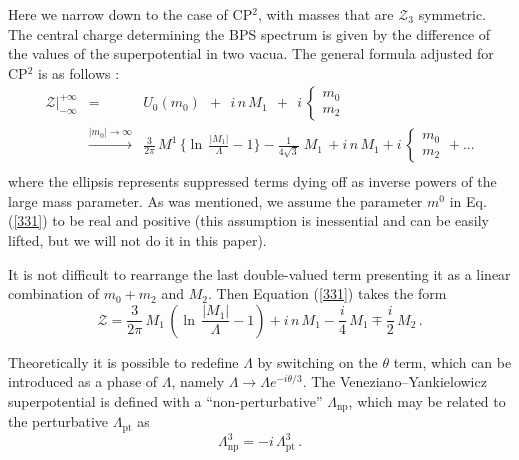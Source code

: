 \documentclass[epsfig,12pt]{article}
\def\beq{\begin{equation}}
\def\eeq{\end{equation}}
\def\beq{\begin{equation}}
\def\eeq{\end{equation}}
\newcommand{\mc}[1]{\mathcal{#1}}
\begin{document}
       Here we narrow down to the case of CP$^2$, with masses that are $ \mc{Z}_3 $ symmetric.
       The central charge determining the BPS spectrum is given by the difference of the values of the superpotential in  two vacua.
       The general formula adjusted for CP$^2$ is as follows \cite{Bolokhov:2011mp}:
\begin{eqnarray}
       \mc{Z}\Big|^{\scriptscriptstyle +\infty}_{\scriptscriptstyle -\infty} 
       &=&
       U_0(m_0)  ~~+~~ i\, n\, M_1 ~~+~~ i\, \left\{
       \begin{array}{ll}
       m_0\\[1mm]m_2
       \end{array}
       \right.
       \nonumber\\[3mm]
       &\stackrel{|m_0|\to\infty}{\longrightarrow}&
       \frac{3}{2\pi}\, M^1\, \Big\{ \ln\, \frac {   |M_1|   }
                                                 {  \Lambda  } -1 \Big\} -  \frac{1}{4\sqrt{3}}\; M_1\, +i\,n\, M_1
       +  i\,\left\{
       \begin{array}{ll}
       m_0\\[1mm]m_2
       \end{array}
       \right. +
       ...
        \nonumber\\[3mm]
       \label{331}
\end{eqnarray}
       where the ellipsis represents  suppressed terms dying off as inverse powers of the large mass parameter.
       As was mentioned, we assume the parameter $ m^0 $ in Eq. (\ref{331}) to be real 
       and positive (this assumption is inessential and can be easily lifted, but we will not do it in this paper).

It is not difficult to rearrange the last double-valued term presenting it as a linear combination of $m_0+m_2$ and $M_2$.
Then Equation (\ref{331}) takes the form
\beq
   \mc{Z} = 
       \frac{3}{2\pi}\, M_1\, \left(  \ln\, \frac {   |M_1|   }
                                                 {  \Lambda  } -1 \right) +i\,n \, M_1
                                                 -\frac{i}{4} \, M_1 \mp \frac{i}{2}\, M_2\,.
                                                 \label{332}
\eeq
{}


       Theoretically it is possible to redefine $ \Lambda $ by switching on the $\theta$ term,
       which can be introduced as a phase of $\Lambda$, namely $\Lambda \to \Lambda e^{-i\theta /3}$.
       The Veneziano--Yankielowicz superpotential is defined with a ``non-perturbative'' 
       $ \Lambda_\text{np} $, which may be related to the perturbative $ \Lambda_\text{pt} $ as
       \beq
       \Lambda_\text{np}^3 =  -i \, \Lambda_\text{pt}^3\,. 
       \eeq
       
\end{document}
